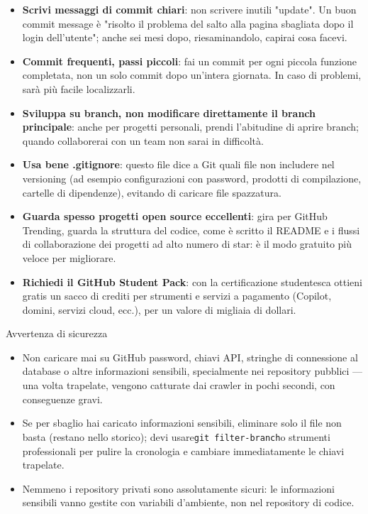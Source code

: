 \begin{itemize}
  \item \textbf{Scrivi messaggi di commit chiari}: non scrivere inutili "update". Un buon commit message è "risolto il problema del salto alla pagina sbagliata dopo il login dell'utente"; anche sei mesi dopo, riesaminandolo, capirai cosa facevi.
  \item \textbf{Commit frequenti, passi piccoli}: fai un commit per ogni piccola funzione completata, non un solo commit dopo un'intera giornata. In caso di problemi, sarà più facile localizzarli.
  \item \textbf{Sviluppa su branch, non modificare direttamente il branch principale}: anche per progetti personali, prendi l'abitudine di aprire branch; quando collaborerai con un team non sarai in difficoltà.
  \item \textbf{Usa bene .gitignore}: questo file dice a Git quali file non includere nel versioning (ad esempio configurazioni con password, prodotti di compilazione, cartelle di dipendenze), evitando di caricare file spazzatura.
  \item \textbf{Guarda spesso progetti open source eccellenti}: gira per GitHub Trending, guarda la struttura del codice, come è scritto il README e i flussi di collaborazione dei progetti ad alto numero di star: è il modo gratuito più veloce per migliorare.
  \item \textbf{Richiedi il GitHub Student Pack}: con la certificazione studentesca ottieni gratis un sacco di crediti per strumenti e servizi a pagamento (Copilot, domini, servizi cloud, ecc.), per un valore di migliaia di dollari.
\end{itemize}

\begin{tcbwarn}{Avvertenza di sicurezza}
\begin{itemize}
  \item Non caricare mai su GitHub password, chiavi API, stringhe di connessione al database o altre informazioni sensibili, specialmente nei repository pubblici — una volta trapelate, vengono catturate dai crawler in pochi secondi, con conseguenze gravi.
  \item Se per sbaglio hai caricato informazioni sensibili, eliminare solo il file non basta (restano nello storico); devi usare\texttt{git filter-\allowbreak branch}o strumenti professionali per pulire la cronologia e cambiare immediatamente le chiavi trapelate.
  \item Nemmeno i repository privati sono assolutamente sicuri: le informazioni sensibili vanno gestite con variabili d'ambiente, non nel repository di codice.
\end{itemize}

\end{tcbwarn}

